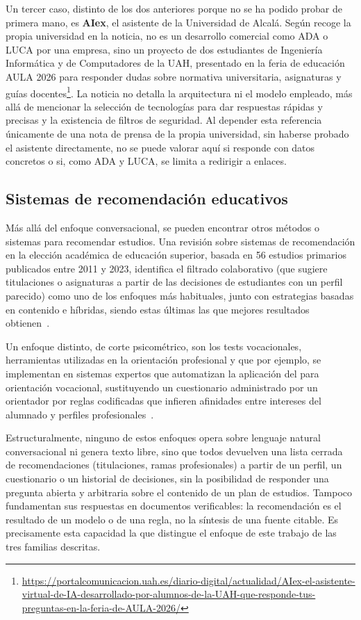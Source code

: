 Un tercer caso, distinto de los dos anteriores porque no se ha podido probar de primera mano, es
\textbf{AIex}, el asistente de la Universidad de Alcalá. Según recoge la propia universidad en la noticia, no es un
desarrollo comercial como ADA o LUCA por una empresa, sino un proyecto de dos estudiantes de Ingeniería Informática y
de Computadores de la UAH, presentado en la feria de educación AULA 2026 para responder dudas sobre normativa universitaria,
asignaturas y guías docentes\footnote{\url{https://portalcomunicacion.uah.es/diario-digital/actualidad/AIex-el-asistente-virtual-de-IA-desarrollado-por-alumnos-de-la-UAH-que-responde-tus-preguntas-en-la-feria-de-AULA-2026/}}.
La noticia no detalla la arquitectura ni el modelo empleado, más allá de mencionar la selección de tecnologías para
dar respuestas rápidas y precisas y la existencia de filtros de seguridad.
Al depender esta referencia únicamente de una nota de prensa de la propia universidad, sin haberse probado el asistente
directamente, no se puede valorar aquí si responde con datos concretos o si, como ADA y LUCA, se limita a redirigir a enlaces.


\subsection{Sistemas de recomendación educativos}

Más allá del enfoque conversacional, se pueden encontrar otros métodos o sistemas para recomendar estudios.
Una revisión sobre sistemas de recomendación en la elección académica de educación superior, basada en 56 estudios primarios publicados entre 2011 y 2023, identifica el filtrado colaborativo
(que sugiere titulaciones o asignaturas a partir de las decisiones de estudiantes con un perfil parecido) como uno de los enfoques más habituales,
junto con estrategias basadas en contenido e híbridas, siendo estas últimas las que mejores resultados obtienen~\cite{kamal2024recommender}.

Un enfoque distinto, de corte psicométrico, son los tests vocacionales, herramientas utilizadas en la
orientación profesional y que por ejemplo, se implementan en sistemas expertos que automatizan la aplicación del
 para orientación vocacional, sustituyendo un cuestionario administrado por un orientador
por reglas codificadas que infieren afinidades entre intereses del alumnado y perfiles profesionales~\cite{huayta2024vocational}.

Estructuralmente, ninguno de estos enfoques opera sobre lenguaje natural conversacional ni genera texto libre, sino que 
todos devuelven una lista cerrada de recomendaciones (titulaciones, ramas profesionales) a partir de un perfil, un cuestionario
o un historial de decisiones, sin la posibilidad de responder una pregunta abierta y arbitraria sobre el contenido de un plan de estudios.
Tampoco fundamentan sus respuestas en documentos verificables: la recomendación es el resultado de un modelo o de una regla,
no la síntesis de una fuente citable. Es precisamente esta capacidad la que distingue el enfoque de este trabajo de las tres familias descritas.


